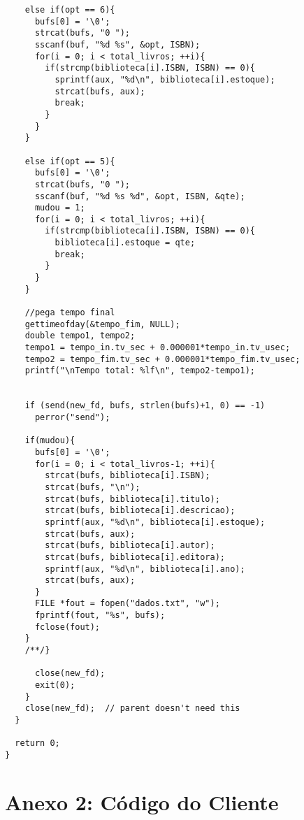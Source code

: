 \documentclass[11pt, brazil]{article} %
\begin{document}
\begin{verbatim}
	else if(opt == 6){
	  bufs[0] = '\0';
	  strcat(bufs, "0 ");
	  sscanf(buf, "%d %s", &opt, ISBN);
	  for(i = 0; i < total_livros; ++i){
	    if(strcmp(biblioteca[i].ISBN, ISBN) == 0){
	      sprintf(aux, "%d\n", biblioteca[i].estoque);
	      strcat(bufs, aux);
	      break;
	    }		    				
	  }
	}
		    	
	else if(opt == 5){
	  bufs[0] = '\0';
	  strcat(bufs, "0 ");
	  sscanf(buf, "%d %s %d", &opt, ISBN, &qte);
	  mudou = 1;
	  for(i = 0; i < total_livros; ++i){
	    if(strcmp(biblioteca[i].ISBN, ISBN) == 0){
	      biblioteca[i].estoque = qte;
	      break;
	    }		    				
	  }
	}
	
	//pega tempo final
	gettimeofday(&tempo_fim, NULL);
	double tempo1, tempo2;
	tempo1 = tempo_in.tv_sec + 0.000001*tempo_in.tv_usec;
	tempo2 = tempo_fim.tv_sec + 0.000001*tempo_fim.tv_usec;
	printf("\nTempo total: %lf\n", tempo2-tempo1);
				
				
	if (send(new_fd, bufs, strlen(bufs)+1, 0) == -1)
	  perror("send");
				
	if(mudou){
	  bufs[0] = '\0';
	  for(i = 0; i < total_livros-1; ++i){
	    strcat(bufs, biblioteca[i].ISBN);
	    strcat(bufs, "\n");
	    strcat(bufs, biblioteca[i].titulo);
	    strcat(bufs, biblioteca[i].descricao);
	    sprintf(aux, "%d\n", biblioteca[i].estoque);
	    strcat(bufs, aux);
	    strcat(bufs, biblioteca[i].autor);
	    strcat(bufs, biblioteca[i].editora);
	    sprintf(aux, "%d\n", biblioteca[i].ano);
	    strcat(bufs, aux);			
	  }
	  FILE *fout = fopen("dados.txt", "w");
	  fprintf(fout, "%s", bufs);
	  fclose(fout);
	}
	/**/}
						
      close(new_fd);
      exit(0);
    }
    close(new_fd);  // parent doesn't need this
  }

  return 0;
}
\end{verbatim}


\section*{Anexo 2: Código do Cliente}
\end{document}
